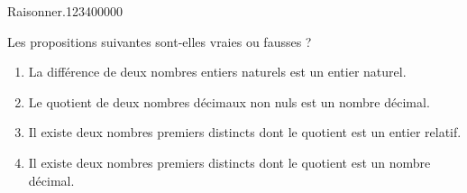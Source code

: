 \begin{pageAD}
 
\begin{ExoCad}{Raisonner.}{1234}{0}{0}{0}{0}{0}

Les propositions suivantes sont-elles vraies ou fausses ?
\begin{enumerate}[leftmargin=*]
\item La différence de deux nombres entiers naturels est un entier naturel. 
\item Le quotient de deux nombres décimaux non nuls est un nombre décimal.  
\item Il existe deux nombres premiers distincts dont le quotient est un
  entier relatif. 
\item Il existe deux nombres premiers distincts dont le quotient est un
  nombre décimal. 
\end{enumerate} 
 
 \end{ExoCad}
 
\end{pageAD}


